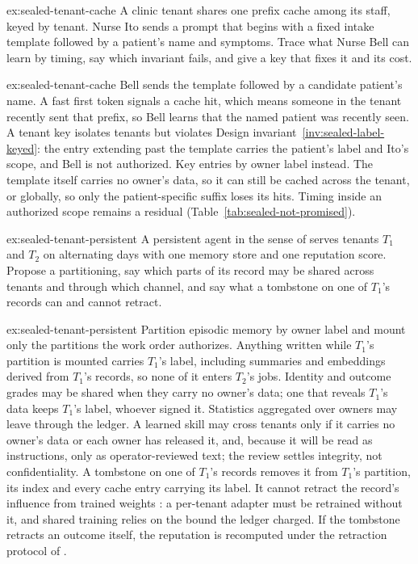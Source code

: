 \begin{pdexercise}[kind=Trace,rating=2]{ex:sealed-tenant-cache}
A clinic tenant shares one prefix cache among its staff, keyed by tenant.
Nurse Ito sends a prompt that begins with a fixed intake template followed by
a patient's name and symptoms. Trace what Nurse Bell can learn by timing, say
which invariant fails, and give a key that fixes it and its cost.
\end{pdexercise}
\begin{pdsolution}{ex:sealed-tenant-cache}
Bell sends the template followed by a candidate patient's name. A fast first
token signals a cache hit, which means someone in the tenant recently sent
that prefix, so Bell learns that the named patient was recently seen. A tenant
key isolates tenants but violates Design invariant~\ref{inv:sealed-label-keyed}:
the entry extending past the template carries the patient's label and Ito's
scope, and Bell is not authorized. Key entries by owner label instead. The
template itself carries no owner's data, so it can still be cached across the
tenant, or globally,
so only the patient-specific suffix loses its hits. Timing inside an
authorized scope remains a residual (Table~\ref{tab:sealed-not-promised}).
\end{pdsolution}

\begin{pdexercise}[kind=Open,rating=3]{ex:sealed-tenant-persistent}
A persistent agent in the sense of 
serves tenants $T_1$ and $T_2$ on alternating days with one memory store and one
reputation score. Propose a partitioning, say which parts of its record may
be shared across tenants and through which channel, and say what a tombstone
on one of $T_1$'s records can and cannot retract.
\end{pdexercise}
\begin{pdsolution}{ex:sealed-tenant-persistent}
Partition episodic memory by owner label and mount only the partitions the
work order authorizes. Anything written while $T_1$'s partition is mounted
carries $T_1$'s label, including summaries and embeddings derived from $T_1$'s
records, so none of it enters $T_2$'s jobs. Identity and outcome grades may be
shared when they carry no owner's data; one that reveals $T_1$'s data keeps
$T_1$'s label, whoever signed it. Statistics aggregated over owners may leave
through the ledger. A learned skill may cross tenants only if it carries no
owner's data or each owner has released it, and, because it will be read as
instructions, only as operator-reviewed text; the review settles integrity,
not confidentiality. A tombstone on one of $T_1$'s records removes it
from $T_1$'s partition, its index and every cache entry carrying its label. It
cannot retract the record's influence from trained weights
: a per-tenant adapter must be retrained without
it, and shared training relies on the bound the ledger charged. If the
tombstone retracts an outcome itself, the reputation is recomputed under the
retraction protocol of .
\end{pdsolution}
